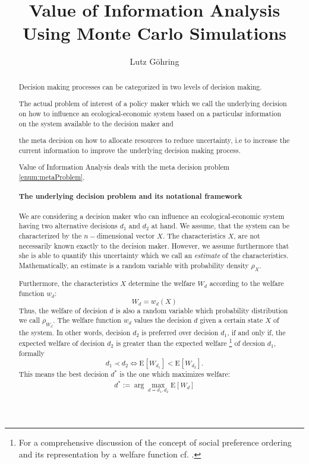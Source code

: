 \documentclass[a4paper,10pt,twoside,pagesize,abstracton]{scrartcl}
\title{Value of Information Analysis Using Monte Carlo Simulations}
\author{Lutz Göhring}
\newcommand{\E}[2][]{\mathrm{E}_{#1}\left[#2\right]} %
\theoremstyle{plain}%
\theoremstyle{definition}
\theoremstyle{remark}
\begin{document}
\maketitle


\begin{abstract}
\renewcommand{\theequation}{ES~\arabic{equation}}
Decision making processes can be categorized in two levels of decision making.
\begin{inparaenum}
 \item \label{enum:underlyingProblem}
  The actual problem of interest of a policy maker which we call the underlying decision on how to influence an ecological-economic system based on a particular information on the system available to the decision maker and
 \item \label{enum:metaProblem}
 the meta decision on how to allocate resources to reduce uncertainty, i.e to increase the current information to improve the underlying decision making process.
\end{inparaenum}
Value of Information Analysis deals with the meta decision problem \ref{enum:metaProblem}.

\paragraph{The underlying decision problem and its notational framework}
We are considering a decision maker who can influence an ecological-economic system having two alternative decisions $d_1$ and $d_2$ at hand. We assume, that the system can be characterized by the $n-$dimensional vector $X$. The characteristics $X$, are not necessarily known exactly to the decision maker. However, we assume furthermore that she is able to quantify this uncertainty which we call an \emph{estimate} of the characteristics. Mathematically, an estimate is a random variable with probability density $\rho_X$.\par

Furthermore, the characteristics $X$ determine the welfare $W_d$ according to the welfare function $w_d$:
\[
 W_d = w_d (X)
\]
Thus, the welfare of decision $d$ is also a random variable which probability distribution we call $\rho_{W_d}$. The welfare function $w_d$ values the decision $d$ given a certain state $X$ of the system. In other words, decision $d_2$ is preferred over decision $d_1$, if and only if, the expected welfare of decision $d_2$ is greater than the expected welfare%
\footnote{\label{fn:welfareFunction}%
  For a comprehensive discussion of the concept of social preference ordering and its representation by a welfare function cf. \citet{GravelleRees2004}.
} of decsion $d_1$, formally
\[
 d_1 \prec d_2 \Leftrightarrow \E{W_{d_1}}< \E{W_{d_2}}.
\]
This means the best decision $d^*$ is the one which maximizes welfare:
\begin{align}
  \label{eqn:executiveSummaryUnderlyingDecisionProblem}
 d^* := \arg \max_{d=d_1,d_2} \E{W_d}
\end{align}


\end{abstract}
\end{document}
